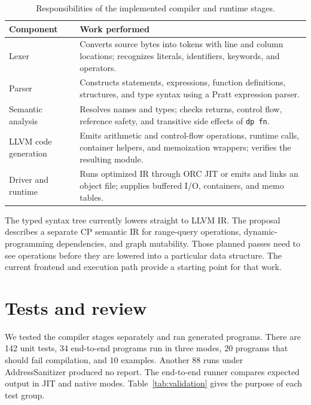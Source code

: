 \documentclass[12pt,a4paper]{report}
\begin{document}
\begin{table}[htbp]
\centering\small
\begin{tabular}{|>{\raggedright\arraybackslash}p{32mm}|>{\raggedright\arraybackslash}p{107mm}|}
\hline
Component & Work performed\\\hline
Lexer & Converts source bytes into tokens with line and column locations; recognizes literals, identifiers, keywords, and operators.\\\hline
Parser & Constructs statements, expressions, function definitions, structures, and type syntax using a Pratt expression parser.\\\hline
Semantic analysis & Resolves names and types; checks returns, control flow, reference safety, and transitive side effects of \texttt{dp fn}.\\\hline
LLVM code generation & Emits arithmetic and control-flow operations, runtime calls, container helpers, and memoization wrappers; verifies the resulting module.\\\hline
Driver and runtime & Runs optimized IR through ORC JIT or emits and links an object file; supplies buffered I/O, containers, and memo tables.\\\hline
\end{tabular}
\caption{Responsibilities of the implemented compiler and runtime stages.}
\label{tab:components}
\end{table}

The typed syntax tree currently lowers straight to LLVM IR. The proposal describes a separate CP semantic IR for range-query operations, dynamic-programming dependencies, and graph mutability. Those planned passes need to see operations before they are lowered into a particular data structure. The current frontend and execution path provide a starting point for that work.

\section{Tests and review}
We tested the compiler stages separately and ran generated programs. There are 142 unit tests, 34 end-to-end programs run in three modes, 20 programs that should fail compilation, and 10 examples. Another 88 runs under AddressSanitizer produced no report. The end-to-end runner compares expected output in JIT and native modes. Table~\ref{tab:validation} gives the purpose of each test group.
\end{document}
